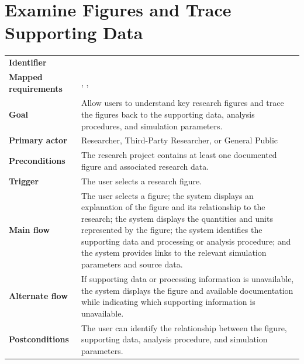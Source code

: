 \section{Examine Figures and Trace Supporting Data}
\begin{tabularx}{\linewidth}{L{3.5cm}Y}
\toprule
\textbf{Identifier} & \\
\textbf{Mapped requirements} & , , \\
\textbf{Goal} & Allow users to understand key research figures and trace the figures back to the supporting data, analysis procedures, and simulation parameters.\\
\textbf{Primary actor} & Researcher, Third-Party Researcher, or General Public\\
\textbf{Preconditions} & The research project contains at least one documented figure and associated research data.\\
\textbf{Trigger} & The user selects a research figure.\\
\textbf{Main flow} & The user selects a figure; the system displays an explanation of the figure and its relationship to the research; the system displays the quantities and units represented by the figure; the system identifies the supporting data and processing or analysis procedure; and the system provides links to the relevant simulation parameters and source data.\\
\textbf{Alternate flow} & If supporting data or processing information is unavailable, the system displays the figure and available documentation while indicating which supporting information is unavailable.\\
\textbf{Postconditions} & The user can identify the relationship between the figure, supporting data, analysis procedure, and simulation parameters.\\
\bottomrule
\end{tabularx}


